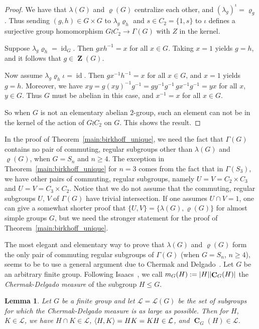 \documentclass[10pt]{amsart}
\newtheorem{lemma}{Lemma}[section]
\renewcommand{\rho}{\varrho}
\renewcommand{\geq}{\geqslant}
\renewcommand{\leq}{\leqslant}
\DeclarePairedDelimiter{\card}{\lvert}{\rvert}
\DeclarePairedDelimiter{\erz}{\langle}{\rangle}
\DeclareMathOperator{\Zentr}{\mathbf{Z}}
\DeclareMathOperator{\Centrl}{\mathbf{C}}
\DeclareMathOperator{\Id}{id}
\begin{document}
\begin{proof}
  We have that $\lambda(G)$ and $\rho(G)$ centralize each other,
  and $(\lambda_g)^{\iota} = \rho_g$.
  Thus sending $(g,h)\in G\times G$ to
  $\lambda_g \rho_h$ and $s\in C_2 = \{1,s\}$
  to $\iota$ defines a surjective group homomorphism
  $G\wr C_2 \to \Gamma(G)$
  with $Z$ in the kernel.
  
  Suppose $\lambda_g \rho_h = \Id_G$.
  Then $gxh^{-1} = x$ for all $x\in G$.
  Taking $x=1$ yields $g=h$, 
  and it follows that  $g\in \Zentr(G)$.
  
  Now assume $\lambda_g \rho_h \iota = \Id$.
  Then $gx^{-1}h^{-1} = x$ for all $x\in G$,
  and $x=1$ yields $g=h$.
  Moreover, we have
  $xy = g (xy)^{-1} g^{-1}
      = g y^{-1} g^{-1} \, g x^{-1} g^{-1}
      = y x$
  for all $x$, $y\in G$.
  Thus $G$ must be abelian in this case, and
  $x^{-1} = x$ for all $x\in G$.
    
  So when $G$ is not an elementary abelian $2$-group,
  such an element can not be in the kernel of the action
  of $G\wr C_2$ on $G$.
  This shows the result.
\end{proof}

In the proof of Theorem~\ref{main:birkhoff_unique}, 
we need the fact
that $\Gamma(G)$ contains no pair of commuting,
regular subgroups other than $\lambda(G)$
and $\rho(G)$, when $G = S_n$ and $n\geq 4$.
The exception in Theorem~\ref{main:birkhoff_unique}
for $n=3$
comes from the fact that 
in $\Gamma(S_3)$, we have other pairs of commuting, regular
subgroups, namely $U=V = C_2 \times C_3$
and $U=V= C_3\times C_2$.
Notice that we do not assume that the commuting, regular subgroups
$U$, $V$
of $\Gamma(G)$ have trivial intersection.
If one assumes $U\cap V=1$, one can give a somewhat 
shorter proof that 
$\{U,V\} = \{ \lambda(G), \rho(G)\}$
for almost simple groups $G$,
but we need the stronger statement for the proof of 
Theorem~\ref{main:birkhoff_unique}.

The most elegant and elementary way to prove 
that $\lambda(G)$ and $\rho(G)$ form the only pair
of commuting regular subgroups of $\Gamma(G)$
(when $G= S_n$, $n\geq 4$),
seems to be to use a general argument due to
Chermak and Delgado~\cite{ChermakDelgado89}.
Let $G$ be an arbitrary finite group.
Following Isaacs~\cite[\S~1G]{IsaacsFGT},
we call $m_G(H) := \card{H}\card{\Centrl_G(H)}$
the \emph{Chermak-Delgado measure} of the subgroup
$H\leq G$.

\begin{lemma}\cite[Theorem~1.44]{IsaacsFGT}
  \label{l:cdlatt}
  Let $G$ be a finite  group and let
  $\mathcal{L} = \mathcal{L}(G)$ be the set of subgroups
  for which the Chermak-Delgado measure is as large as 
  possible.
  Then for $H$, $K\in \mathcal{L}$, we have
  $H\cap K\in \mathcal{L}$,
  $\erz{H,K} =HK=KH \in \mathcal{L}$, 
  and $\Centrl_G(H)\in \mathcal{L}$.
\end{lemma}
\end{document}
